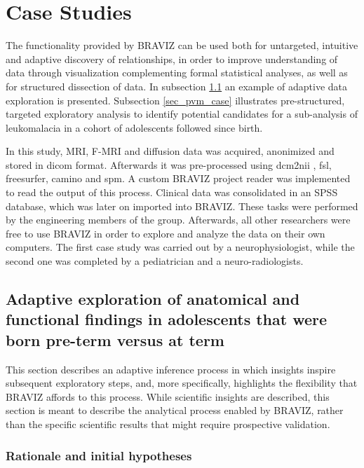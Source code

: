 \documentclass[twocolumn]{svjour3}
\begin{document}
\section{Case Studies}

The functionality provided by BRAVIZ can be used both for untargeted, intuitive and adaptive discovery of relationships, in order to improve understanding of data through visualization complementing formal statistical analyses, as well as for structured dissection of data. In subsection \ref{sec_case_cyril} an example of adaptive data exploration is presented. Subsection \ref{sec_pvm_case} illustrates pre-structured, targeted exploratory analysis to identify potential candidates for a sub-analysis of leukomalacia in a cohort of adolescents followed since birth. 

In this study, MRI, F-MRI and diffusion data was acquired, anonimized and stored in dicom format. Afterwards it was pre-processed using dcm2nii \cite{rorden_mricron_2007}, fsl\cite{jenkinson_fsl_2012}, freesurfer\cite{fischl_freesurfer_2012}, camino\cite{cook_camino:_2006} and spm\cite{friston_statistical_2007}. A custom BRAVIZ project reader was implemented to read the output of this process. 
Clinical data was consolidated in an SPSS database, which was later on imported into BRAVIZ. These tasks were performed by the engineering members of the group. Afterwards, all other researchers were free to use BRAVIZ in order to explore and analyze the data on their own computers. The first case study was carried out by a neurophysiologist, while the second one was completed by a  pediatrician and a neuro-radiologists. 

 
\subsection{Adaptive exploration of anatomical and functional findings in adolescents that were born pre-term versus at term}
\label{sec_case_cyril}

This section describes an adaptive inference process in which insights inspire subsequent exploratory steps, and, more specifically, highlights the flexibility that BRAVIZ affords to this process. While scientific insights are described, this section is meant to describe the analytical process enabled by BRAVIZ, rather than the specific scientific results that might require prospective validation.

\subsubsection{Rationale and initial hypotheses}
\end{document}
